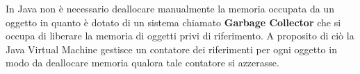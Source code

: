 \documentclass{subfiles}
\begin{document}
    In Java non è necessario deallocare manualmente la memoria occupata da un oggetto in quanto è dotato 
    di un sistema chiamato \textbf{Garbage Collector} che si occupa di liberare la memoria di oggetti privi di riferimento.
    A proposito di ciò la Java Virtual Machine gestisce un contatore dei riferimenti per ogni oggetto in modo da deallocare 
    memoria qualora tale contatore si azzerasse.
\end{document}
